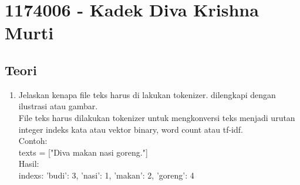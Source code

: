 \section{1174006 - Kadek Diva Krishna Murti}

\subsection{Teori}
\begin{enumerate}
	\item Jelaskan kenapa file teks harus di lakukan tokenizer. dilengkapi dengan ilustrasi atau gambar.\\
	File teks harus dilakukan tokenizer untuk mengkonversi teks menjadi urutan integer indeks kata atau vektor binary, word count atau tf-idf.\\
	Contoh:\\
	texts = ["Diva makan nasi goreng."]\\
	Hasil:\\
	indexs: {'budi': 3, 'nasi': 1, 'makan': 2, 'goreng': 4}


\end{enumerate}

